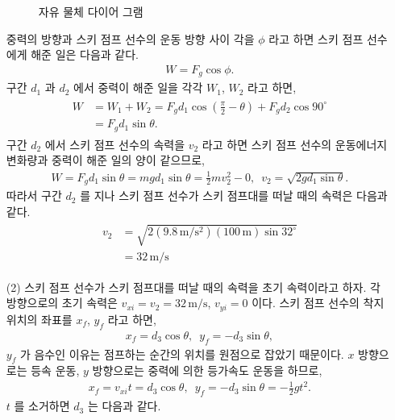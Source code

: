 \documentclass[floatfix,nofootinbib,superscriptaddress,fleqn]{revtex4-2}
\begin{document}
\begin{itemize}
\begin{figure}[h]
 \caption{자유 물체 다이어 그램}
  \end{figure}
  중력의 방향과 스키 점프 선수의 운동 방향 사이 각을 $\phi$ 라고 하면 
  스키 점프 선수에게 해준 일은 다음과 같다.
  \begin{align}
  W = F_g\cos{\phi}  .
  \end{align}
  구간 $d_1$ 과 $d_2$ 에서 중력이 해준 일을 각각 $W_1$, $W_2$ 라고 하면,
  \begin{align}
    \begin{split}
      W &= W_1 + W_2 
      = F_g d_1\cos{\left(\frac{\pi}{2}-\theta\right)} + F_gd_2\cos{90^\circ}  \\
      &=F_g d_1\sin{\theta}.
     \end{split}
  \end{align}
  구간 $d_2$ 에서 스키 점프 선수의 속력을 $v_2$ 라고 하면 
  스키 점프 선수의 운동에너지 변화량과 중력이 해준 일의 양이 같으므로,
  \begin{align}
    W = F_g d_1\sin{\theta}=mgd_1\sin{\theta}=\frac{1}{2}mv_2^2-0,\,\,\, 
    v_2 = \sqrt{2gd_1\sin{\theta}}.
  \end{align}
  따라서 구간 $d_2$ 를 지나 스키 점프 선수가 스키 점프대를 떠날 때의 속력은 다음과 같다.
  \begin{align}
    \begin{split}
      v_2 &= \sqrt{2(9.8\,\mathrm{m/s^2})(100\,\mathrm{m})\sin{32^\circ}}  \\
      &= 32\,\mathrm{m/s}
    \end{split}
  \end{align}
  \item[(2)] 스키 점프 선수가 스키 점프대를 떠날 때의 속력을 초기 속력이라고 하자. 
  각 방향으로의 초기 속력은 $v_{xi}=v_2=32\,\mathrm{m/s}$, $v_{yi}=0$ 이다. 
  스키 점프 선수의 착지 위치의 좌표를 $x_f$, $y_f$ 라고 하면,
  \begin{align}\label{eq:2-1}
    x_f = d_3\cos{\theta},\,\,\, y_f = -d_3\sin{\theta},
  \end{align}
  $y_f$ 가 음수인 이유는 점프하는 순간의 위치를 원점으로 잡았기 때문이다. 
  $x$ 방향으로는 등속 운동, $y$ 방향으로는 중력에 의한 등가속도 운동을 하므로,
  \begin{align}
    x_f = v_{xi}t= d_3\cos{\theta},\,\,\,
    y_f= -d_3\sin{\theta}=-\frac{1}{2}gt^2.
  \end{align}
  $t$ 를 소거하면 $d_3$ 는 다음과 같다.

\end{itemize}
\end{document}

